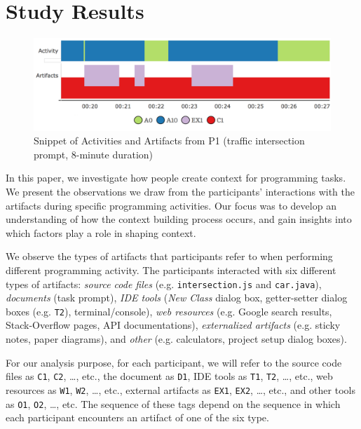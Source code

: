 
\section{Study Results}



\begin{figure}
\includegraphics[width=\columnwidth]{figures/P1timeplot}
\caption{Snippet of Activities and Artifacts from P1 (traffic intersection prompt, 8-minute duration)}
\label{P1Fig}
\end{figure}

In this paper, we investigate how people create context for programming tasks. We present the observations we draw from the participants' interactions with the artifacts during specific programming activities. Our focus was to develop an understanding of how the context building process occurs, and gain insights into which factors play a role in shaping context.


We observe the types of artifacts that participants refer to when performing different programming activity. The participants interacted with six different types of artifacts: \textit{source code files} (e.g. \texttt{intersection.js} and \texttt{car.java}), \textit{documents} (task prompt), \textit{IDE tools} (\textit{New Class} dialog box, getter-setter dialog boxes (e.g. \texttt{T2}), terminal/console),\textit{ web resources} (e.g. Google search results, Stack-Overflow pages, API documentations), \textit{externalized artifacts} (e.g. sticky notes, paper diagrams), and \textit{other} (e.g. calculators, project setup dialog boxes).

For our analysis purpose, for each participant, we will refer to the source code files as \texttt{C1}, \texttt{C2}, \ldots , etc., the document as \texttt{D1}, IDE tools as \texttt{T1}, \texttt{T2}, \ldots, etc., web resources as \texttt{W1}, \texttt{W2}, \ldots, etc., external artifacts as \texttt{EX1}, \texttt{EX2}, \ldots, etc., and other tools as \texttt{O1}, \texttt{O2}, \ldots, etc. The sequence of these tags depend on the sequence in which each participant encounters an artifact of one of the six type. 

